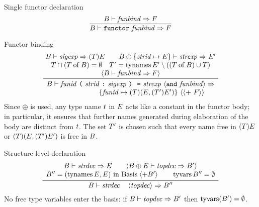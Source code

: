 
\begin{inference-rule}{Single functor declaration}
\begin{equation}\label{rule:static-modules:singfundec}
  \vcenter{\infer{ \B\ts\singfundec\ra\F }
    { \B\ts\funbind\ra\F }}
\end{equation}
\end{inference-rule}

\begin{inference-rule}{Functor binding}
\begin{equation}\label{rule:static-modules:functor-binding}
  \vcenter{\infer{\begin{array}{c}
        \B\ts\barefunstrbinder\ \optional{\mbox{\texttt{and} \funbind}}\ra\\
       \qquad\qquad \qquad
              \{\funid\mapsto(\T)(\E,(\T')\E')\}
              \ \optional{\optional{ +\ \F}}
      \end{array}}
  {\deduce{\optional{\B\ts\funbind\ra\F}}
    {\deduce{\T\cap(\of{\T}{\B}) = \emptyset\quad \T' = \TyNamesFcn\E'\setminus((\of{\T}{\B})\cup\T)}
      {\B\ts\sigexp\ra(\T)\E\qquad
      \B\oplus\{\strid\mapsto\E\} \ts\strexp\ra\E'}}}}
\end{equation}
Since $\oplus$ is used, any type name $t$ in $E$ acts like a constant in the functor body; in particular,
it ensures that further names generated during elaboration of the
body are distinct from $t$. The set $T'$ is
chosen such that every  name free
in $(T)E$ or $(T)(E,(T')E')$ is free in $B$.
\end{inference-rule}


\begin{inference-rule}{Structure-level declaration}
\begin{equation}\label{rule:static-modules:strdectopdec}
\vcenter{\infer{\B\ts\strdecintopdec\ra\B''}
    {\begin{array}{c}
        \B\ts\strdec\ra\E \qquad \optional{\B\oplus \E\ts \topdec\ra \B'}\\
        B'' = (\TyNamesFcn\E,\E)\ \In\ \Basis\; \optional{ + \B'}\qquad\TyVarFcn\B''=\emptyset
      \end{array}}}
\end{equation}
No free type variables enter the  basis: if $B\vdash\textit{topdec\/}\Rightarrow B'$
then $\mathop{\rm tyvars}\nolimits(B') = \emptyset$.
\end{inference-rule}

